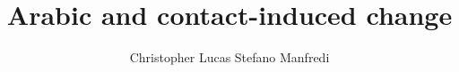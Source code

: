\title{Arabic and contact-induced change}  %
\author{Christopher Lucas \lastand Stefano Manfredi}
\subtitle{}
\renewcommand{\lsISBNdigital}{000-0-000000-00-0}
\renewcommand{\lsISBNhardcover}{000-0-000000-00-0}
\renewcommand{\lsISBNsoftcover}{000-0-000000-00-0}
\renewcommand{\lsSeries}{cam} %
\renewcommand{\lsSeriesNumber}{} %

  